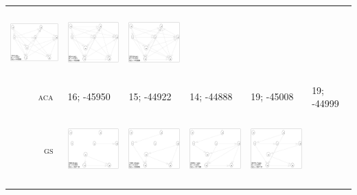 \begin{table}[!p]
\begin{tabular}{r@{}p{2.9cm}@{}p{2.9cm}@{}p{2.9cm}@{}p{2.9cm}@{}p{2.90cm}}
\includegraphics[width=29.34mm, height=26.7mm]{fig/GS-ACA-2000} &
\includegraphics[width=29.34mm, height=26.7mm]{fig/GS-ACA-5000} &
\includegraphics[width=29.34mm, height=26.7mm]{fig/GS-ACA-10000} \\
\textsc{aca~}
& 16; -45950 & 15; -44922 & 14; -44888 & 19; -45008 & 19; -44999 \\
\textsc{gs~} &
\includegraphics[width=29.34mm, height=26.7mm]{fig/GS-EM-500} &
\includegraphics[width=29.34mm, height=26.7mm]{fig/GS-EM-1000} &
\includegraphics[width=29.34mm, height=26.7mm]{fig/GS-EM-2000} &
\includegraphics[width=29.34mm, height=26.7mm]{fig/GS-EM-5000} &

\end{tabular}
\end{table}
